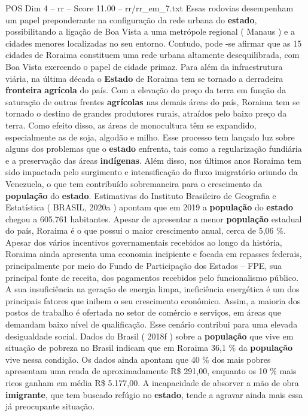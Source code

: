 \begin{textsample}{POS Dim 4 – rr – Score 11.00 – rr/rr\_em\_7.txt}
Essas rodovias desempenham um papel preponderante na configuração da rede urbana do \textbf{estado}, possibilitando a ligação de Boa Vista a uma metrópole regional ( Manaus ) e a cidades menores localizadas no seu entorno.
Contudo, pode -se afirmar que as 15 cidades de Roraima constituem uma rede urbana altamente desequilibrada, com Boa Vista exercendo o papel de cidade primaz.
Para além da infraestrutura viária, na última década o \textbf{Estado} de Roraima tem se tornado a derradeira \textbf{fronteira} \textbf{agrícola} do país.
Com a elevação do preço da terra em função da saturação de outras frentes \textbf{agrícolas} nas demais áreas do país, Roraima tem se tornado o destino de grandes produtores rurais, atraídos pelo baixo preço da terra.
Como efeito disso, as áreas de monocultura têm se expandido, especialmente as de soja, algodão e milho.
Esse processo tem lançado luz sobre alguns dos problemas que o \textbf{estado} enfrenta, tais como a regularização fundiária e a preservação das áreas \textbf{indígenas}.
Além disso, nos últimos anos Roraima tem sido impactada pelo surgimento e intensificação do fluxo imigratório oriundo da Venezuela, o que tem contribuído sobremaneira para o crescimento da \textbf{população} do \textbf{estado}.
Estimativas do Instituto Brasileiro de Geografia e Estatística ( BRASIL, 2020a ) apontam que em 2019 a \textbf{população} do \textbf{estado} chegou a 605.761 habitantes.
Apesar de apresentar a menor \textbf{população} estadual do país, Roraima é o que possui o maior crescimento anual, cerca de 5,06 \%.
Apesar dos vários incentivos governamentais recebidos ao longo da história, Roraima ainda apresenta uma economia incipiente e focada em repasses federais, principalmente por meio do Fundo de Participação dos Estados – FPE, sua principal fonte de receita, dos pagamentos recebidos pelo funcionalismo público.
A sua insuficiência na geração de energia limpa, ineficiência energética é um dos principais fatores que inibem o seu crescimento econômico.
Assim, a maioria dos postos de trabalho é ofertada no setor de comércio e serviços, em áreas que demandam baixo nível de qualificação.
Esse cenário contribui para uma elevada desigualdade social.
Dados do Brasil ( 2018f ) sobre a \textbf{população} que vive em situação de pobreza no Brasil indicam que em Roraima 36,1 \% da \textbf{população} vive nessa condição.
Os dados ainda apontam que 40 \% dos mais pobres apresentam uma renda de aproximadamente R\$ 291,00, enquanto os 10 \% mais ricos ganham em média R\$ 5.177,00.
A incapacidade de absorver a mão de obra \textbf{imigrante}, que tem buscado refúgio no \textbf{estado}, tende a agravar ainda mais essa já preocupante situação.

\end{textsample}
